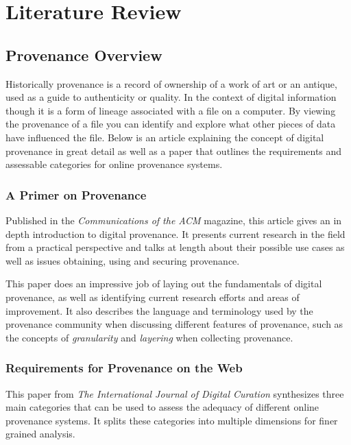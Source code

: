 \chapter{Literature Review}

\section{Provenance Overview}
\label{sec:provenance_overview}

Historically provenance is a record of ownership of a work of art or an antique, used as a guide to authenticity or quality. In the context of digital information though it is a form of lineage associated with a file on a computer. By viewing the provenance of a file you can identify and explore what other pieces of data have influenced the file. Below is an article explaining the concept of digital provenance in great detail as well as a paper that outlines the requirements and assessable categories for online provenance systems.

\subsection{A Primer on Provenance\cite{Carata2014}}
\label{sub:a_primer_on_provenance}

Published in the \textit{Communications of the ACM} magazine, this article gives an in depth introduction to digital provenance. It presents current research in the field from a practical perspective and talks at length about their possible use cases as well as issues obtaining, using and securing provenance.

This paper does an impressive job of laying out the fundamentals of digital provenance, as well as identifying current research efforts and areas of improvement. It also describes the language and terminology used by the provenance community when discussing different features of provenance, such as the concepts of \textit{granularity} and \textit{layering} when collecting provenance.

\subsection{Requirements for Provenance on the Web\cite{Groth2012}}
\label{sub:requirements_for_provenance_on_the_web}

This paper from \textit{The International Journal of Digital Curation} synthesizes three main categories that can be used to assess the adequacy of different online provenance systems. It splits these categories into multiple dimensions for finer grained analysis.

